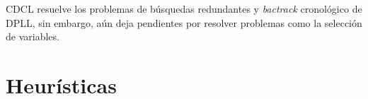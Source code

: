 



CDCL resuelve los problemas de b\'usquedas redundantes y \textit{bactrack} cronol\'ogico de DPLL, sin embargo, a\'un deja pendientes por resolver problemas como la selecci\'on de variables.


\section{Heur\'isticas}
\label{sec:heuristicas}

